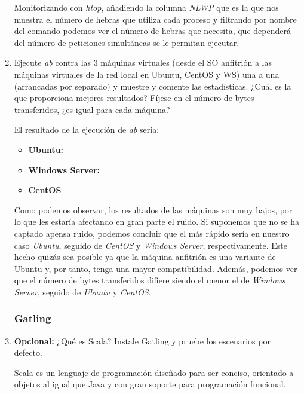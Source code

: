 \documentclass[paper=a4, fontsize=11pt]{scrartcl} %
\numberwithin{equation}{section} %
\numberwithin{figure}{section} %
\numberwithin{table}{section} %
\begin{document}
\begin{enumerate}
		Monitorizando con \textit{htop}\cite{man_htop}, añadiendo la columna \textit{NLWP} que es la
		que nos muestra el número de hebras que utiliza cada proceso y filtrando por nombre del comando
		podemos ver el número de hebras que necesita, que dependerá del número de peticiones simultáneas
		se le permitan ejecutar.
		
		\item Ejecute \textit{ab} contra las 3 máquinas virtuales (desde el SO anfitrión a las máquinas
		virtuales de la red local en Ubuntu, CentOS y WS) una a una (arrancadas por separado) y muestre
		y comente las estadísticas. ¿Cuál es la que proporciona mejores resultados? Fíjese en el número
		de bytes transferidos, ¿es igual para cada máquina?
		
		El resultado de la ejecución de \textit{ab} sería:
		
		\begin{itemize}
			\item \textbf{Ubuntu:}
			
			
			\item \textbf{Windows Server:}
			
			
			\item \textbf{CentOS}
			
		\end{itemize}
		
		Como podemos observar, los resultados de las máquinas son muy bajos, por lo que les estaría
		afectando en gran parte el ruido. Si suponemos que no se ha captado apensa ruido, podemos
		concluir que el más rápido sería en nuestro caso \textit{Ubuntu}, seguido de \textit{CentOS}
		y \textit{Windows Server}, respectivamente. Este hecho quizás sea posible ya que la máquina
		anfitrión es una variante de Ubuntu y, por tanto, tenga una mayor compatibilidad. Además,
		podemos ver que el número de bytes transferidos difiere siendo el menor el de \textit{Windows
		Server}, seguido de \textit{Ubuntu} y \textit{CentOS}.
		
	\subsubsection{Gatling}
		\item \textbf{Opcional:} ¿Qué es Scala? Instale Gatling y pruebe los escenarios por defecto.
		
		Scala\cite{Scala} es un lenguaje de programación diseñado para ser conciso, orientado a objetos
		al igual que Java y con gran soporte para programación funcional.
		

\end{enumerate}
\end{document}
